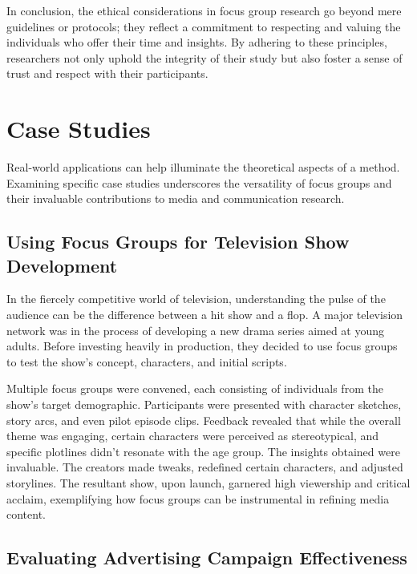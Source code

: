 \documentclass[
  b5paper]{book}
\begin{document}
In conclusion, the ethical considerations in focus group research go beyond mere guidelines or protocols; they reflect a commitment to respecting and valuing the individuals who offer their time and insights. By adhering to these principles, researchers not only uphold the integrity of their study but also foster a sense of trust and respect with their participants.

\hypertarget{case-studies}{%
\section{Case Studies}\label{case-studies}}

Real-world applications can help illuminate the theoretical aspects of a method. Examining specific case studies underscores the versatility of focus groups and their invaluable contributions to media and communication research.

\hypertarget{using-focus-groups-for-television-show-development}{%
\subsection*{Using Focus Groups for Television Show Development}\label{using-focus-groups-for-television-show-development}}

In the fiercely competitive world of television, understanding the pulse of the audience can be the difference between a hit show and a flop. A major television network was in the process of developing a new drama series aimed at young adults. Before investing heavily in production, they decided to use focus groups to test the show's concept, characters, and initial scripts.

Multiple focus groups were convened, each consisting of individuals from the show's target demographic. Participants were presented with character sketches, story arcs, and even pilot episode clips. Feedback revealed that while the overall theme was engaging, certain characters were perceived as stereotypical, and specific plotlines didn't resonate with the age group. The insights obtained were invaluable. The creators made tweaks, redefined certain characters, and adjusted storylines. The resultant show, upon launch, garnered high viewership and critical acclaim, exemplifying how focus groups can be instrumental in refining media content.

\hypertarget{evaluating-advertising-campaign-effectiveness}{%
\subsection*{Evaluating Advertising Campaign Effectiveness}\label{evaluating-advertising-campaign-effectiveness}}
\end{document}
